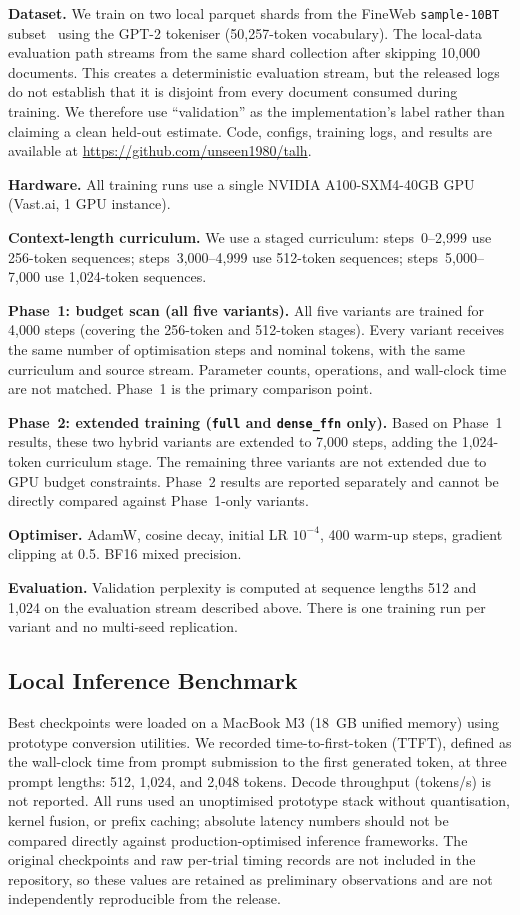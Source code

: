 \documentclass[conference]{IEEEtran}
\begin{document}
\textbf{Dataset.} We train on two local parquet shards from the FineWeb
\texttt{sample-10BT} subset~\cite{fineweb2024} using the GPT-2 tokeniser
(50{,}257-token vocabulary). The local-data evaluation path streams from the
same shard collection after skipping 10{,}000 documents. This creates a
deterministic evaluation stream, but the released logs do not establish that
it is disjoint from every document consumed during training. We therefore use
``validation'' as the implementation's label rather than claiming a clean
held-out estimate. Code, configs, training logs, and results are available at
\url{https://github.com/unseen1980/talh}.

\textbf{Hardware.} All training runs use a single NVIDIA A100-SXM4-40GB GPU
(Vast.ai, 1 GPU instance).

\textbf{Context-length curriculum.} We use a staged curriculum:
steps~0--2{,}999 use 256-token sequences; steps~3{,}000--4{,}999 use
512-token sequences; steps~5{,}000--7{,}000 use 1{,}024-token sequences.

\textbf{Phase~1: budget scan (all five variants).} All five variants are
trained for 4{,}000 steps (covering the 256-token and 512-token stages). Every
variant receives the same number of optimisation steps and nominal tokens,
with the same curriculum and source stream. Parameter counts, operations, and
wall-clock time are not matched. Phase~1 is the primary comparison point.

\textbf{Phase~2: extended training (\texttt{full} and \texttt{dense\_ffn}
only).} Based on Phase~1 results, these two hybrid variants are
extended to 7{,}000 steps, adding the 1{,}024-token curriculum stage. The
remaining three variants are not extended due to GPU budget constraints.
Phase~2 results are reported separately and cannot be directly compared
against Phase~1-only variants.

\textbf{Optimiser.} AdamW, cosine decay, initial LR $10^{-4}$, 400 warm-up
steps, gradient clipping at 0.5. BF16 mixed precision.

\textbf{Evaluation.} Validation perplexity is computed at sequence lengths 512
and 1{,}024 on the evaluation stream described above. There is one training
run per variant and no multi-seed replication.

\subsection{Local Inference Benchmark}

Best checkpoints were loaded on a MacBook M3 (18~GB unified memory) using
prototype conversion utilities. We recorded time-to-first-token (TTFT), defined as the wall-clock time from
prompt submission to the first generated token, at three prompt lengths:
512, 1{,}024, and 2{,}048 tokens. Decode throughput
(tokens/s) is not reported. All runs used an unoptimised
prototype stack without quantisation, kernel fusion, or prefix caching;
absolute latency numbers should not be compared directly against
production-optimised inference frameworks. The original checkpoints and raw
per-trial timing records are not included in the repository, so these values
are retained as preliminary observations and are not independently
reproducible from the release.
\end{document}
